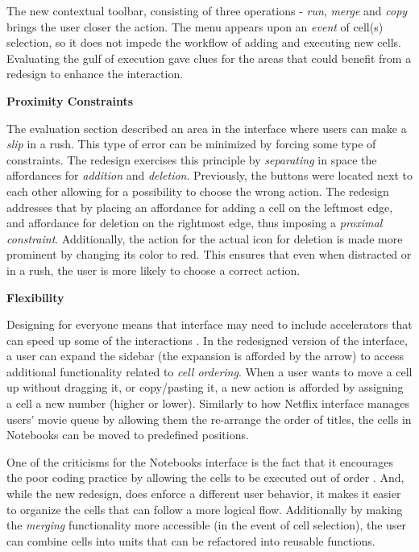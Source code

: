 \documentclass[12pt,letterpaper]{article}
\begin{document}
The new contextual toolbar, consisting of three operations - \textit{run}, \textit{merge} and \textit{copy} brings the user closer the action. The menu appears upon an \textit{event} of cell(s) selection, so it does not impede the workflow of adding and executing new cells. Evaluating the gulf of execution gave clues for the areas that could benefit from a redesign to enhance the interaction. 

\textbf{Proximity Constraints}

The evaluation section described an area in the interface where users can make a \textit{slip} in a rush. This type of error can be minimized by forcing some type of constraints. The redesign exercises this principle by \textit{separating} in space the affordances for \textit{addition} and \textit{deletion}. Previously, the buttons were located next to each other allowing for a possibility to choose the wrong action. The redesign addresses that by placing an affordance for adding a cell on the leftmost edge, and affordance for deletion on the rightmost edge, thus imposing a \textit{proximal constraint}.  Additionally, the action for the actual icon for deletion is made more prominent by changing its color to red. This ensures that even when distracted or in a rush, the user is more likely to choose a correct action.

\textbf{Flexibility}

Designing for everyone means that interface may need to include accelerators that can speed up some of the interactions \cite{nielsen1994usability}. In the redesigned version of the interface, a user can expand the sidebar (the expansion is afforded by the arrow) to access additional functionality related to \textit{cell ordering}. When a user wants to move a cell up without dragging it, or copy/pasting it, a new action is afforded by assigning a cell a new number (higher or lower). Similarly to how Netflix interface manages users' movie queue by allowing them the re-arrange the order of titles, the cells in Notebooks can be moved to predefined positions. 

One of the criticisms for the Notebooks interface is the fact that it encourages the poor coding practice by allowing the cells to be executed out of order \cite{perkel2018jupyter}. And, while the new redesign, does enforce a different user behavior, it makes it easier to organize the cells that can follow a more logical flow. Additionally by making the \textit{merging} functionality more accessible (in the event of cell selection), the user can combine cells into units that can be refactored into reusable functions. 
\end{document}
